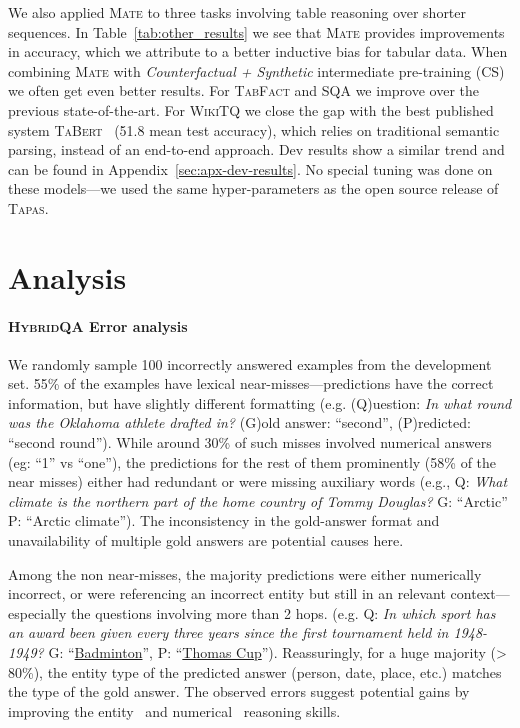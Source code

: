 \documentclass[11pt]{article}
\newcommand{\entity}[1]{\underline{#1}}
\newcommand\sqa{\textsc{SQA}\xspace}
\newcommand\tabfact{\textsc{TabFact}\xspace}
\newcommand\wtq{\textsc{WikiTQ}\xspace}
\newcommand\hqa{\textsc{HybridQA}\xspace}
\newcommand{\tapas}{\textsc{Tapas}\xspace}
\newcommand{\tabert}{\textsc{TaBert}\xspace}
\newcommand{\model}{\textsc{Mate}\xspace}
\begin{document}
We also applied \model to three tasks involving table reasoning over shorter sequences. 
In Table~\ref{tab:other_results} we see that \model provides improvements in accuracy, which we attribute to a better inductive bias for tabular data. When combining \model with \emph{Counterfactual + Synthetic} intermediate pre-training (CS)~\cite{eisenschlos-etal-2020-understanding} we often get even better results. For \tabfact and \sqa we improve over the previous state-of-the-art. For \wtq we close the gap with the best published system \tabert~\cite{yin-etal-2020-tabert} (51.8 mean test accuracy), which relies on traditional semantic parsing, instead of an end-to-end approach. Dev results show a similar trend and can be found in Appendix~\ref{sec:apx-dev-results}. No special tuning was done on these models---we used the same hyper-parameters as the open source release of \tapas. \section{Analysis}
\label{sec:analysis}
\paragraph{\hqa Error analysis} We randomly sample 100 incorrectly answered examples from the development set. 55\% of the examples have lexical near-misses---predictions have the correct information, but have slightly different formatting (e.g. (Q)uestion: \textit{In what round was the Oklahoma athlete drafted in?} (G)old answer: ``second'', (P)redicted: ``second round''). 
While around 30\% of such misses involved numerical answers (eg: ``1'' vs ``one''), the predictions for the rest of them prominently (58\% of the near misses) either had redundant or were missing auxiliary words (e.g., Q: \textit{What climate is the northern part of the home country of Tommy Douglas?} G: ``Arctic'' P: ``Arctic climate''). The inconsistency in the gold-answer format and unavailability of multiple gold answers are potential causes here.

Among the non near-misses, the majority predictions were either numerically incorrect, or were referencing an incorrect entity but still in an relevant context---especially the questions involving more than 2 hops.
(e.g. Q: \textit{In which sport has an award been given every three years since the first tournament held in 1948-1949?} G: ``\entity{Badminton}'', P: ``\entity{Thomas Cup}''). 
Reassuringly, for a huge majority (> 80\%), the entity type of the predicted answer (person, date, place, etc.) matches the type of the gold answer.
The observed errors suggest potential gains by improving the entity~\cite{Xiong2020Pretrained} and numerical~\cite{andor-etal-2019-giving} reasoning skills.
\end{document}
